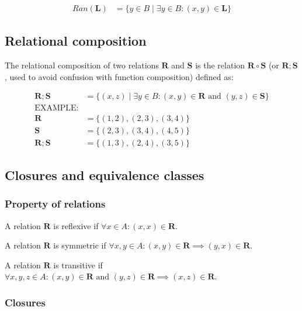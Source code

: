 \documentclass{article}
\begin{document}
\begin{align*}
    Ran(\mathbf{L}) & = \{y \in B \mid \exists y \in B : (x, y) \in \mathbf{L}\}
\end{align*}

\subsection{Relational composition}

The relational composition of two relations $\mathbf{R}$ and $\mathbf{S}$ is the relation $\mathbf{R} \circ \mathbf{S}$ (or $\mathbf{R};\mathbf{S}$, used to avoid confusion with function composition) defined as:

\begin{align*}
    \mathbf{R} ; \mathbf{S} & = \{(x, z) \mid \exists y \in B : (x, y) \in \mathbf{R} \text{ and } (y, z) \in \mathbf{S}\} \\
    \text{EXAMPLE:}                                                                                                        \\
    \mathbf{R}              & = \{(1, 2), (2, 3), (3, 4)\}                                                                 \\
    \mathbf{S}              & = \{(2, 3), (3, 4), (4, 5)\}                                                                 \\
    \mathbf{R} ; \mathbf{S} & = \{(1, 3), (2, 4), (3, 5)\}
\end{align*}

\subsection{Closures and equivalence classes}

\subsubsection{Property of relations}

A relation $\mathbf{R}$ is reflexive if $\forall x \in A : (x, x) \in \mathbf{R}$.

A relation $\mathbf{R}$ is symmetric if $\forall x, y \in A : (x, y) \in \mathbf{R} \implies (y, x) \in \mathbf{R}$.

A relation $\mathbf{R}$ is transitive if $\forall x, y, z \in A : (x, y) \in \mathbf{R} \text{ and } (y, z) \in \mathbf{R} \implies (x, z) \in \mathbf{R}$.



\subsubsection{Closures}
\end{document}
